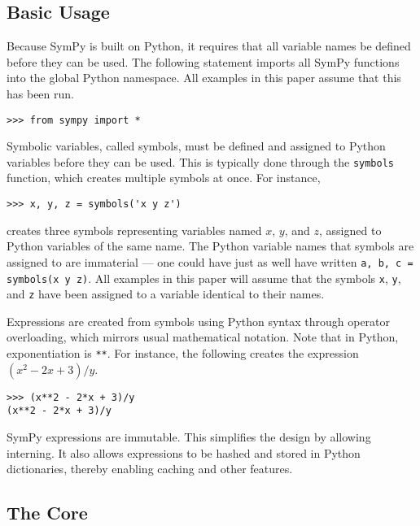
\subsection{Basic Usage}


Because SymPy is built on Python, it requires that all variable names be
defined before they can be used. The following statement
imports all SymPy functions into the global Python namespace.
All examples in this paper assume that this has been run.

\begin{verbatim}
>>> from sympy import *
\end{verbatim}

Symbolic variables, called symbols, must be defined and assigned to
Python variables before they can be used. This is typically done through the
\texttt{symbols} function, which creates multiple symbols at once. For
instance,
\begin{verbatim}
>>> x, y, z = symbols('x y z')
\end{verbatim}
creates three symbols representing variables named $x$, $y$, and $z$, assigned
to Python variables of the same name. The Python variable names that symbols
are assigned to are immaterial --- one could have just as well have written
\texttt{a, b, c = symbols(\textquotesingle{}x y z\textquotesingle{})}. All examples in this paper will assume that
the symbols \verb|x|, \verb|y|, and \verb|z| have been assigned to a variable
identical to their names.

Expressions are created from symbols using Python syntax through operator
overloading, which mirrors usual mathematical notation. Note that in Python,
exponentiation is \verb|**|. For instance, the following creates the expression
$(x^2 - 2x + 3)/y$.

\begin{verbatim}
>>> (x**2 - 2*x + 3)/y
(x**2 - 2*x + 3)/y
\end{verbatim}

SymPy expressions are immutable. This simplifies the design by allowing
interning. It also allows expressions to be hashed and stored in Python
dictionaries, thereby enabling caching and other features.


\subsection{The Core}

